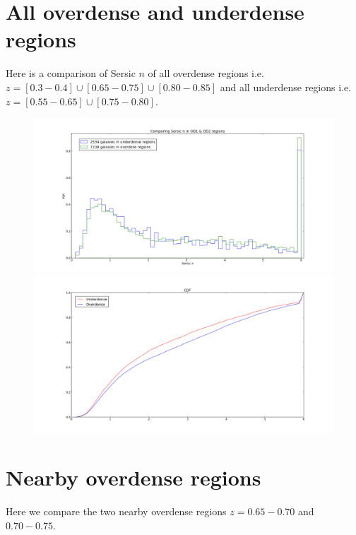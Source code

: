 \documentclass[a4paper,10pt]{article}
\begin{document}
\section{All overdense and underdense regions}
Here is a comparison of Sersic $n$ of all overdense regions i.e. $z=[0.3-0.4] \cup [0.65-0.75] \cup [0.80-0.85]$ and all underdense regions
i.e. $z=[0.55-0.65]\cup[0.75-0.80]$.
\begin{figure}[ht]
 \centering
  \includegraphics[scale=0.3]{hist_sersicn_ODUD.png}
  \includegraphics[scale=0.3]{cdf_sersicn_ODUD.png}
\end{figure}

\pagebreak 
\section{Nearby overdense regions}
Here we compare the two nearby overdense regions $z=0.65-0.70$ and $0.70-0.75$.
\end{document}
